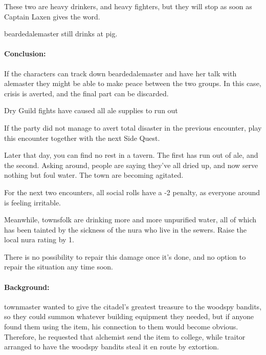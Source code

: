 \begin{multicols}{2}

These two are heavy drinkers, and heavy fighters, but they will stop as soon as Captain Laxen gives the word.


\Gls{beardedalemaster} still drinks at \gls{pig}.  

\paragraph{Conclusion:} If the characters can track down \gls{beardedalemaster} and have her talk with \gls{alemaster} they might be able to make peace between the two groups.
In this case, crisis is averted, and the final part can be discarded.

\beardedalemaster

{\N\squash Dry}%
{Guild fights have caused all ale supplies to run out}%

If the party did not manage to avert total disaster in the previous encounter, play this encounter together with the next Side Quest.

\begin{boxtext}

  Later that day, you can find no rest in a tavern.  The first has run out of ale, and the second.  Asking around, people are saying they've all dried up, and now serve nothing but foul water.  The town are becoming agitated.

\end{boxtext}

For the next two encounters, all social rolls have a -2 penalty, as everyone around is feeling irritable.

Meanwhile, townsfolk are drinking more and more unpurified water, all of which has been tainted by the sickness of the nura who live in the sewers.  Raise the local nura rating by 1.

There is no possibility to repair this damage once it's done, and no option to repair the situation any time soon.

\stopcontents[sq]

\resumecontents[Villages]
\label{lizardite}
\stopcontents[Villages]

\startcontents[sq]

\sqminitoc

\noindent
\paragraph{Background:}
\gls{townmaster} wanted to give the citadel's greatest treasure to the woodspy bandits, so they could summon whatever building equipment they needed, but if anyone found them using the item, his connection to them would become obvious.
Therefore, he requested that \gls{alchemist} send the item to \gls{college}, while \gls{traitor} arranged to have the woodspy bandits steal it en route by extortion.


\end{multicols}
